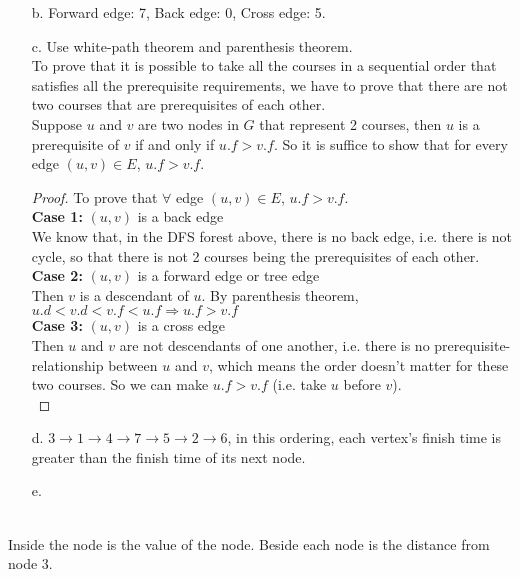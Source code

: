 \documentclass[10pt]{article}
\begin{document}
\begin{itemize}
\item[b.] Forward edge: 7, Back edge: 0, Cross edge: 5.
\item[c.] Use white-path theorem and parenthesis theorem.\\
To prove that it is possible to take all the courses
in a sequential order that satisfies all the prerequisite requirements, we have to prove that there are not two courses that are prerequisites of each other. \\
Suppose $u$ and $v$ are two nodes in $G$ that represent 2 courses, then $u$ is a prerequisite of $v$ if and only if $u.f>v.f$. So it is suffice to show that for every edge $(u,v)\in E$, $u.f>v.f$.
\begin{proof} To prove that $\forall$ edge $(u,v)\in E$, $u.f>v.f$.\\
\textbf{Case 1:} $(u, v)$ is a back edge\\
We know that, in the DFS forest above, there is no back edge, i.e. there is not cycle, so that there is not 2 courses being the prerequisites of each other.\\
\textbf{Case 2:} $(u,v)$ is a forward edge or tree edge\\
Then $v$ is a descendant of $u$. By parenthesis theorem, $u.d<v.d<v.f<u.f\Rightarrow u.f>v.f$\\
\textbf{Case 3:} $(u,v)$ is a cross edge\\
Then $u$ and $v$ are not descendants of one another, i.e. there is no prerequisite-relationship between $u$ and $v$, which means the order doesn't matter for these two courses. So we can make $u.f>v.f$ (i.e. take $u$ before $v$).\\
\end{proof}
\item[d.] $3\rightarrow 1\rightarrow 4\rightarrow 7\rightarrow 5\rightarrow 2\rightarrow 6$, in this ordering, each vertex's finish time is greater than the finish time of its next node.
\item[e.]
\end{itemize}
\\
Inside the node is the value of the node. Beside each node is the distance from node 3.
\end{document}
